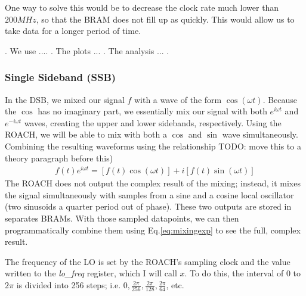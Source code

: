 \documentclass[12pt]{article}
\begin{document}
One way to solve this would be to decrease the clock rate much lower than $200 MHz$, so that the BRAM does not fill up as quickly. This would allow us to take data for a longer period of time.

. We use .... . The plots ... . The analysis ... .

\subsubsection*{Single Sideband (SSB)}
In the DSB, we mixed our signal $f$ with a wave of the form $\cos(\omega t)$. Because the $\cos$ has no imaginary part, we essentially mix our signal with both $e^{i \omega t}$ and $e^{-i \omega t}$ waves, creating the upper and lower sidebands, respectively. Using the ROACH, we will be able to mix with both a $\cos$ and $\sin$ wave simultaneously. Combining the resulting waveforms using the relationship TODO: move this to a theory paragraph before this)
\begin{eqnarray}
f(t) e^{i\omega t} = [f(t) \cos(\omega t)] + i [f(t) \sin(\omega t)] \label{eq:mixingexp}
\end{eqnarray}
The ROACH does not output the complex result of the mixing; instead, it mixes the signal simultaneously with samples from a sine and a cosine local oscillator (two sinusoids a quarter period out of phase). These two outputs are stored in separates BRAMs. With those sampled datapoints, we can then programmatically combine them using Eq.\ref{eq:mixingexp} to see the full, complex result.

The frequency of the LO is set by the ROACH's sampling clock and the value written to the \textit{lo\_freq} register, which I will call $x$. To do this, the interval of $0$ to $2\pi$ is divided into 256 steps; i.e. $0, \frac{2\pi}{256}, \frac{2\pi}{128}, \frac{2\pi}{64}$, etc. 
\end{document}
